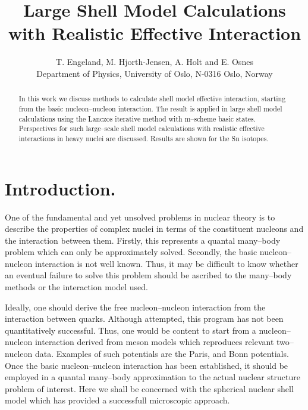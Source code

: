 \newcommand{\be}{\begin{equation}}
\newcommand{\ee}{\end{equation}}
\newcommand{\bra}[1]{\left\langle #1 \right|}
\newcommand{\ket}[1]{\left| #1 \right\rangle}
\newcommand{\braket}[2]{\left\langle #1 \right| #2 \right\rangle}
\newcommand{\OP}[1]{{\bf\widehat{#1}}}
\newcommand{\matr}[1]{{\bf \cal{#1}}}
%
\title{Large Shell Model Calculations with Realistic  Effective Interaction}
\author{T. Engeland, M. Hjorth-Jensen, A. Holt and E. Osnes\\[2ex]
Department of Physics, University of Oslo, N-0316 Oslo, Norway}
%



%
\maketitle
%
\begin{abstract}
In this work we discuss methods to calculate shell model
effective interaction, starting from the basic nucleon--nucleon
interaction. The result is applied in large shell model calculations
using the Lanczos iterative method with m--scheme basic states.
Perspectives for such large--scale shell model calculations with
realistic effective interactions in heavy nuclei are discussed.
Results are shown for the Sn isotopes.
\end{abstract}
%


%
%
\section{Introduction.}
%
One of the fundamental and yet unsolved problems in nuclear theory
is to describe the properties of complex nuclei in terms of
the constituent nucleons and the interaction between them.
Firstly, this represents a quantal many--body problem which can only
be approximately solved. Secondly, the basic nucleon--nucleon
interaction is not well known. Thus, it may be difficult to
know whether an eventual failure to solve this problem should be
ascribed to the many--body methods or the interaction model used.

Ideally, one should derive the free nucleon--nucleon interaction
from the interaction between quarks. Although attempted,
this program has not been quantitatively successful. Thus, one would
be  content to start from a nucleon--nucleon interaction
derived from  meson models which reproduces relevant
two--nucleon data. Examples of such potentials are the Paris\cite{lac80},
and Bonn\cite{mac89} potentials.
 Once the basic nucleon--nucleon
interaction has been established, it should be employed in a
quantal many--body approximation to the actual nuclear structure
problem of interest. Here we shall be concerned  with the spherical
nuclear shell model which has provided a successfull microscopic
approach.

